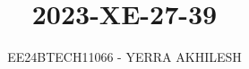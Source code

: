 \documentclass[journal]{IEEEtran}
\begin{document}

\vspace{3cm}

\title{2023-XE-27-39}
\author{EE24BTECH11066 - YERRA AKHILESH
}
{\let\newpage\relax\maketitle}

\renewcommand{\thefigure}{\theenumi}
\renewcommand{\thetable}{\theenumi}
\setlength{\intextsep}{10pt} %


\renewcommand{\thetable}{\theenumi}
\end{document}
